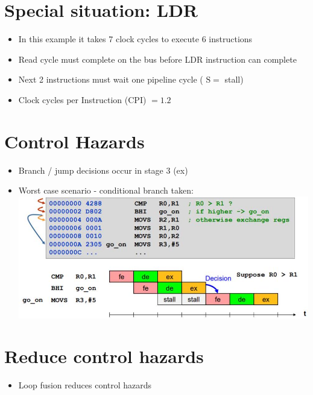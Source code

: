 \documentclass[10pt]{article}
\begin{document}
\section*{Special situation: LDR}
\begin{itemize}
  \item In this example it takes 7 clock cycles to execute 6 instructions
  \item Read cycle must complete on the bus before LDR instruction can complete
  \item Next 2 instructions must wait one pipeline cycle ( $\mathrm{S}=$ stall)
  \item Clock cycles per Instruction (CPI) $=1.2$
\end{itemize}

\section*{Control Hazards}
\begin{itemize}
  \item Branch / jump decisions occur in stage 3 (ex)
  \item Worst case scenario - conditional branch taken:\\
\includegraphics[width=\linewidth]{images/2024_12_29_79e6b22f503fb7b4f718g-15}
\end{itemize}

\section*{Reduce control hazards}
\begin{itemize}
  \item Loop fusion reduces control hazards
\end{itemize}
\end{document}
